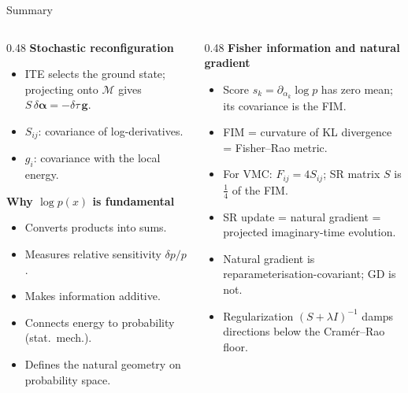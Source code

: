 \documentclass[aspectratio=169]{beamer}
\begin{document}
\begin{frame}{Summary}
\begin{columns}[T]
\begin{column}{0.48\textwidth}
\textbf{Stochastic reconfiguration}
\begin{itemize}\setlength\itemsep{3pt}
  \item ITE selects the ground state;
        projecting onto \(\mathcal{M}\) gives
        \(S\,\delta\bm{\alpha}=-\delta\tau\,\bm{g}\).
  \item \(S_{ij}\): covariance of log-derivatives.
  \item \(g_i\): covariance with the local energy.
\end{itemize}

\textbf{Why \(\log p(x)\) is fundamental}
\begin{itemize}\setlength\itemsep{3pt}
  \item Converts products into sums.
  \item Measures relative sensitivity \(\delta p/p\).
  \item Makes information additive.
  \item Connects energy to probability (stat.\ mech.).
  \item Defines the natural geometry on
        probability space.
\end{itemize}
\end{column}
\begin{column}{0.48\textwidth}
\textbf{Fisher information and natural gradient}
\begin{itemize}\setlength\itemsep{3pt}
  \item Score \(s_k=\partial_{\alpha_k}\log p\)
        has zero mean; its covariance is the FIM.
  \item FIM = curvature of KL divergence
        = Fisher--Rao metric.
  \item For VMC: \(F_{ij}=4S_{ij}\);
        SR matrix \(S\) is \(\tfrac{1}{4}\) of the FIM.
  \item SR update = natural gradient
        = projected imaginary-time evolution.
  \item Natural gradient is reparameterisation-covariant;
        GD is not.
  \item Regularization \((S{+}\lambda I)^{-1}\) damps
        directions below the Cram\'er--Rao floor.
\end{itemize}
\end{column}
\end{columns}
\end{frame}
\end{document}
